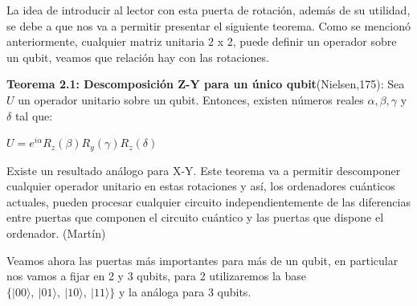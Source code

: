  La idea de introducir al lector con esta puerta de rotación, además de su utilidad, se debe a que nos va a permitir presentar el siguiente teorema. Como se mencionó anteriormente, cualquier matriz unitaria 2 x 2, puede definir un operador sobre un qubit, veamos que relación hay con las rotaciones. \newline
 
 \textbf{Teorema 2.1: Descomposición Z-Y para un único qubit}(Nielsen,175): Sea $U$ un operador unitario sobre un qubit. Entonces, existen números reales $\alpha,\beta,\gamma$ y $\delta$ tal que:
 \begin{center}
     $U = e^{i\alpha} R_{z}(\beta)R_{y}(\gamma)R_{z}(\delta)$
 \end{center}

 Existe un resultado análogo para X-Y. Este teorema va a permitir descomponer cualquier operador unitario en estas rotaciones y así, los ordenadores cuánticos actuales, pueden procesar cualquier circuito independientemente de las diferencias entre puertas que componen el circuito cuántico y las puertas que dispone el ordenador. (Martín) \newline

 Veamos ahora las puertas más importantes para más de un qubit, en particular nos vamos a fijar en 2 y 3 qubits, para 2 utilizaremos la base $\{|00\rangle,\:|01\rangle,\:|10\rangle,\:|11\rangle\}$ y la análoga para 3 qubits.

